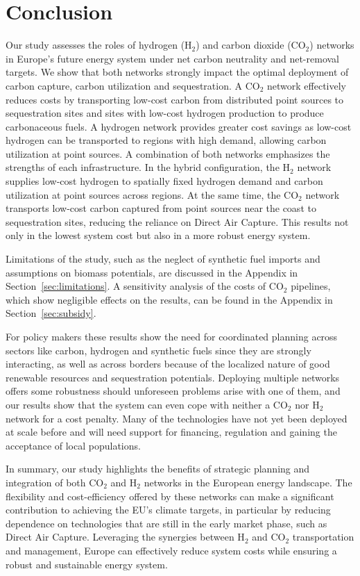 \documentclass[twocolumn]{article}
\newcommand{\carbon}{CO$_2$}
\newcommand{\hydrogen}{H$_2$}
\begin{document}
\section{Conclusion}
\label{sec:conclusion}
Our study assesses the roles of hydrogen (\hydrogen{}) and carbon dioxide (\carbon{}) networks in Europe's future energy system under net carbon neutrality and net-removal targets. We show that both networks strongly impact the optimal deployment of carbon capture, carbon utilization and sequestration. A \carbon{} network effectively reduces costs by transporting low-cost carbon from distributed point sources to sequestration sites and sites with low-cost hydrogen production to produce carbonaceous fuels. A hydrogen network provides greater cost savings as low-cost hydrogen can be transported to regions with high demand, allowing carbon utilization at point sources. A combination of both networks emphasizes the strengths of each infrastructure. In the hybrid configuration, the \hydrogen{} network supplies low-cost hydrogen to spatially fixed hydrogen demand and carbon utilization at point sources across regions. At the same time, the \carbon{} network transports low-cost carbon captured from point sources near the coast to sequestration sites, reducing the reliance on Direct Air Capture. This results not only in the lowest system cost but also in a more robust energy system.


Limitations of the study, such as the neglect of synthetic fuel imports and assumptions on biomass potentials, are discussed in the Appendix in Section~\ref{sec:limitations}. A sensitivity analysis of the costs of \carbon{} pipelines, which show negligible effects on the results, can be found in the Appendix in Section~\ref{sec:subsidy}.

For policy makers these results show the need for coordinated planning across sectors like carbon, hydrogen and synthetic fuels since they are strongly interacting, as well as across borders because of the localized nature of good renewable resources and sequestration potentials. Deploying multiple networks offers some robustness should unforeseen problems arise with one of them, and our results show that the system can even cope with neither a \carbon{} nor \hydrogen{} network for a cost penalty.  Many of the technologies have not yet been deployed at scale before and will need support for financing, regulation and gaining the acceptance of local populations.

In summary, our study highlights the benefits of strategic planning and integration of both \carbon{} and \hydrogen{} networks in the European energy landscape. The flexibility and cost-efficiency offered by these networks can make a significant contribution to achieving the EU's climate targets, in particular by reducing dependence on technologies that are still in the early market phase, such as Direct Air Capture. Leveraging the synergies between \hydrogen{} and \carbon{} transportation and management, Europe can effectively reduce system costs while ensuring a robust and sustainable energy system.
\end{document}
